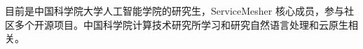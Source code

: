 

\begin{cvparagraph}
\begin{minipage}[t]{\textwidth}
目前是中国科学院大学人工智能学院的研究生，ServiceMesher 核心成员，参与社区多个开源项目。中国科学院计算技术研究所学习和研究自然语言处理和云原生相关。
\end{minipage}
\end{cvparagraph}
